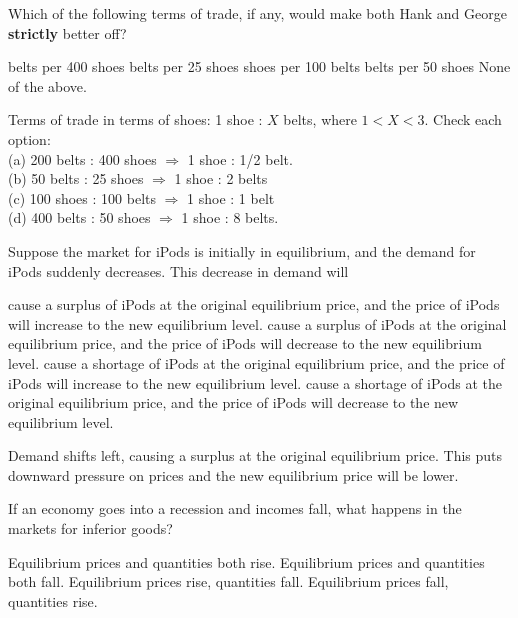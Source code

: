 \documentclass[addpoints,11pt]{exam}
\theoremstyle{definition}
\begin{document}
\begin{questions}
\question \label{blah6} Which of the following terms of trade, if any, would make both Hank and George \textbf{strictly} better off?

\begin{choices}
	 belts per 400 shoes
	 belts per 25 shoes
	 shoes per 100 belts
	 belts per 50 shoes
	\choice None of the above.
\end{choices}

	\begin{solution}
		Terms of trade in terms of shoes: 1 shoe : $X$ belts, where $1<X<3$. Check each option: \\
		(a) 200 belts : 400 shoes $\Rightarrow$ 1 shoe : 1/2 belt. \\
		(b) 50 belts : 25 shoes $\Rightarrow$ 1 shoe : 2 belts \\
		(c) 100 shoes : 100 belts $\Rightarrow$ 1 shoe : 1 belt \\
		(d) 400 belts : 50 shoes $\Rightarrow$ 1 shoe : 8 belts.
	\end{solution}

		
\question Suppose the market for iPods is initially in equilibrium, and the demand for iPods suddenly decreases. This decrease in demand will

\begin{choices}
	\choice cause a surplus of iPods at the original equilibrium price, and the price of iPods will increase to the new equilibrium level.
	\CorrectChoice cause a surplus of iPods at the original equilibrium price, and the price of iPods will decrease to the new equilibrium level.
	\choice cause a shortage of iPods at the original equilibrium price, and the price of iPods will increase to the new equilibrium level.
	\choice cause a shortage of iPods at the original equilibrium price, and the price of iPods will decrease to the new equilibrium level.
\end{choices}

\begin{solution}
	Demand shifts left, causing a surplus at the original equilibrium price. This puts downward pressure on prices and the new equilibrium price will be lower.
\end{solution}

\question If an economy goes into a recession and incomes fall, what happens in the markets for inferior goods?

\begin{choices}
	\CorrectChoice Equilibrium prices and quantities both rise.
	\choice Equilibrium prices and quantities both fall.
	\choice Equilibrium prices rise, quantities fall.
	\choice Equilibrium prices fall, quantities rise.
\end{choices}


\end{questions}
\end{document}
